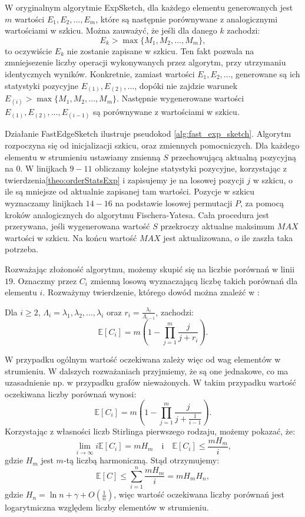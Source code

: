     W oryginalnym algorytmie ExpSketch, dla każdego elementu generowanych jest $m$ wartości $E_{1}, E_{2}, \dots, E_{m}$, które są następnie porównywane z analogicznymi wartościami w szkicu. Można zauważyć, że jeśli dla danego $k$ zachodzi:
    \[
        E_{k} > \max{\{M_1, M_2, \dots, M_m\}},     
    \]
    to oczywiście $E_{k}$ nie zostanie zapisane w szkicu. Ten fakt pozwala na zmniejsezenie liczby operacji wykonywanych przez algorytm, przy utrzymaniu identycznych wyników. Konkretnie, zamiast wartości $E_{1}, E_{2}, \dots$, generowane są ich statystyki pozycyjne $E_{(1)}, E_{(2)}, \dots$, dopóki nie zajdzie warunek $E_{(i)} > \max{\{M_1, M_2, \dots, M_m\}}$. Następnie wygenerowane wartości $E_{(1)}, E_{(2)}, \dots, E_{(i - 1)}$ są porównywane z wartościami w szkicu. 
    
    Działanie FastEdgeSketch ilustruje pseudokod \ref{alg:fast_exp_sketch}. Algorytm rozpoczyna się od inicjalizacji szkicu, oraz zmiennych pomocniczych. Dla każdego elementu w strumieniu ustawiamy zmienną $S$ przechowującą aktualną pozycyjną na $0$. W linijkach $9-11$ obliczamy kolejne statystyki pozycyjne, korzystając z twierdzenia\ref{theo:orderStatsExp} i zapisujemy je na losowej pozycji $j$ w szkicu, o ile są mniejsze od aktualnie zapisanej tam wartości. Pozycje w  szkicu wyznaczamy linijkach $14-16$ na podstawie losowej permutacji $P$, za pomocą kroków analogicznych do algorytmu Fischera-Yatesa. Cała procedura jest przerywana, jeśli wygenerowana wartość $S$ przekroczy aktualne maksimum $MAX$ wartości w szkicu. Na końcu wartość $MAX$ jest aktualizowana, o ile zaszła taka potrzeba.

    Rozważając złożoność algorytmu, możemy skupić się na liczbie porównań w linii $19$. Oznaczmy przez $C_i$ zmienną losową wyznaczającą liczbę takich porównań dla elementu $i$. Rozważymy twierdzenie, którego dowód można znależć w \cite{Lemiesz_2023}:
    \begin{twierdzenie}
        \label{theo:avgComp}        
        Dla $i \geq 2$, $\Lambda_{i} = \lambda_{1}, \lambda_{2}, \dots, \lambda_{i}$ oraz $r_i = \frac{\lambda_{i}}{\Lambda_{i - 1}}$, zachodzi:
        \[
            \mathbb{E}[C_i] = m \left( 1 - \prod_{j = 1}^{m} \frac{j}{j + r_i} \right).   
        \]
    \end{twierdzenie}
    W przypadku ogólnym wartość oczekiwana zależy więc od wag elementów w strumieniu. W dalszych rozważaniach przyjmiemy, że są one jednakowe, co ma uzasadnienie np. w przypadku grafów nieważonych. W takim przypadku wartość oczekiwana liczby porównań wynosi: 
    \[
        \mathbb{E}[C_i] = m \left( 1 - \prod_{j = 1}^{m} \frac{j}{j + \frac{1}{i - 1}} \right) .
    \]
    Korzystając z własności liczb Stirlinga pierwszego rodzaju, możemy pokazać, że:
    \[
        \lim_{i \to \infty} i \mathbb{E}[C_i] = m H_m \quad \text{i} \quad \mathbb{E}[C_i] \leq \frac{m H_m}{i},
    \]
    gdzie $H_m$ jest $m$-tą liczbą harmoniczną. Stąd otrzymujemy:
    \[
        \mathbb{E}[C] \leq \sum\limits_{i = 1}^{n} \frac{m H_m}{i} = m H_m H_n,
    \]
    gdzie $H_n = \ln n + \gamma + O(\frac{1}{n})$, więc wartość oczekiwana liczby porównań jest logarytmiczna względem liczby elementów w strumieniu.

